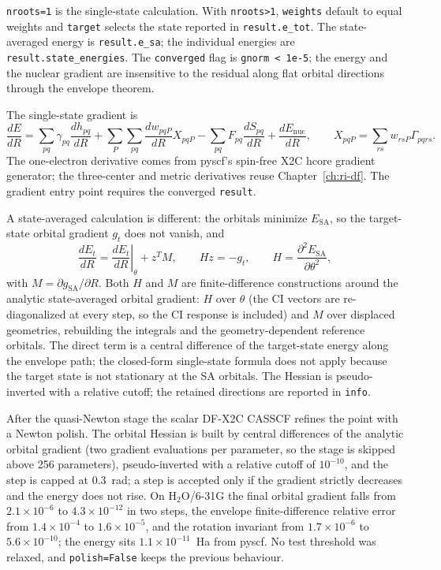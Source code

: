 \texttt{nroots=1} is the single-state calculation.  With
\texttt{nroots>1}, \texttt{weights} default to equal weights and
\texttt{target} selects the state reported in \texttt{result.e\_tot}.
The state-averaged energy is \texttt{result.e\_sa}; the individual
energies are \texttt{result.state\_energies}.  The \texttt{converged}
flag is \texttt{gnorm < 1e-5}; the energy and the nuclear gradient are
insensitive to the residual along flat orbital directions through the
envelope theorem.

The single-state gradient is
\begin{equation}
  \frac{dE}{dR}
  = \sum_{pq}\gamma_{pq}\frac{dh_{pq}}{dR}
  + \sum_P\sum_{pq}\frac{dw_{pqP}}{dR}X_{pqP}
  - \sum_{pq}F_{pq}\frac{dS_{pq}}{dR}
  + \frac{dE_{\mathrm{nuc}}}{dR},
  \qquad
  X_{pqP}=\sum_{rs}w_{rsP}\Gamma_{pqrs}.
  \label{eq:x2c-scalar-gradient}
\end{equation}
The one-electron derivative comes from pyscf's spin-free X2C hcore
gradient generator; the three-center and metric derivatives reuse
Chapter~\ref{ch:ri-df}.  The gradient entry point requires the
converged \texttt{result}.

A state-averaged calculation is different: the orbitals minimize
$E_{\mathrm{SA}}$, so the target-state orbital gradient $g_t$ does not
vanish, and
\begin{equation}
  \frac{dE_t}{dR}
  = \left.\frac{dE_t}{dR}\right|_{\theta}+z^{T}M,
  \qquad
  Hz=-g_t,
  \qquad
  H=\frac{\partial^{2}E_{\mathrm{SA}}}{\partial\theta^{2}},
  \label{eq:x2c-scalar-sa}
\end{equation}
with $M=\partial g_{\mathrm{SA}}/\partial R$.  Both $H$ and $M$ are
finite-difference constructions around the analytic state-averaged
orbital gradient: $H$ over $\theta$ (the CI vectors are re-diagonalized
at every step, so the CI response is included) and $M$ over displaced
geometries, rebuilding the integrals and the geometry-dependent
reference orbitals.  The direct term is a central difference of the
target-state energy along the envelope path; the closed-form
single-state formula does not apply because the target state is not
stationary at the SA orbitals.  The Hessian is pseudo-inverted with a
relative cutoff; the retained directions are reported in
\texttt{info}.

After the quasi-Newton stage the scalar DF-X2C CASSCF refines the point
with a Newton polish.  The orbital Hessian is built by central
differences of the analytic orbital gradient (two gradient evaluations
per parameter, so the stage is skipped above 256 parameters),
pseudo-inverted with a relative cutoff of $10^{-10}$, and the step is
capped at 0.3~rad; a step is accepted only if the gradient strictly
decreases and the energy does not rise.  On H$_2$O/6-31G the final
orbital gradient falls from $2.1\times10^{-6}$ to $4.3\times10^{-12}$ in
two steps, the envelope finite-difference relative error from
$1.4\times10^{-4}$ to $1.6\times10^{-5}$, and the rotation invariant from
$1.7\times10^{-6}$ to $5.6\times10^{-10}$; the energy sits
$1.1\times10^{-11}$~Ha from pyscf.  No test threshold was relaxed, and
\texttt{polish=False} keeps the previous behaviour.

